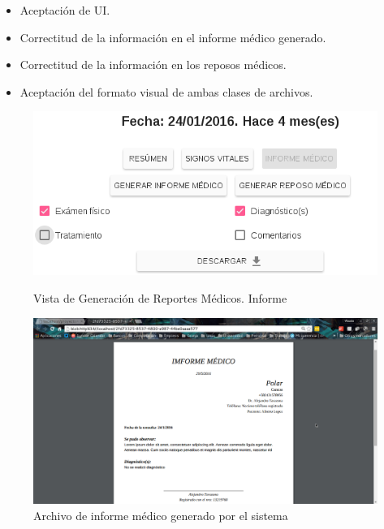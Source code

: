     \begin{itemize}
        \item Aceptación de UI.
        \item Correctitud de la información en el informe médico generado.
        \item Correctitud de la información en los reposos médicos.
        \item Aceptación del formato visual de ambas clases de archivos.
    \end{itemize}
    \begin{figure}[htb!]
        \begin{minipage}{0.45\textwidth}
            \begin{center}
                \includegraphics[width=\linewidth,keepaspectratio=true]{figures/reportes-informenav}
            \end{center}
            \caption{Vista de Generación de Reportes Médicos. Informe}
            \label{reportes-informenav}
        \end{minipage}
        \hspace*{\fill}
        \begin{minipage}{0.45\textwidth}
            \begin{center}
                \includegraphics[width=\linewidth,keepaspectratio=true]{figures/reportes-informepdf}
            \end{center}
            \caption{Archivo de informe médico generado por el sistema}
            \label{reportes-informepdf}
        \end{minipage}
    \end{figure}
    
